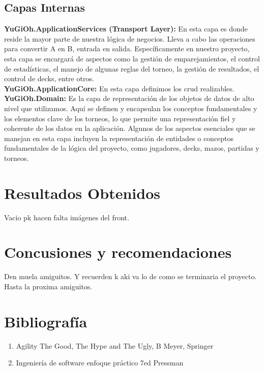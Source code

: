 \documentclass[a4paper]{article}
\begin{document}
\subsection{Capas Internas}
\textbf{YuGiOh.ApplicationServices (Transport Layer):} En esta capa es donde reside la mayor parte de nuestra lógica
de negocios. Lleva a cabo las operaciones para convertir A en B, entrada en salida.
Específicamente en nuestro proyecto, esta capa se encargará de aspectos como la
gestión de emparejamientos, el control de estadísticas, el manejo de algunas reglas
del torneo, la gestión de resultados, el control de decks, entre otros.\\
\textbf{YuGiOh.ApplicationCore:} En esta capa definimos los crud realizables.\\
\textbf{YuGiOh.Domain:} Es la capa de representación de los objetos de datos de alto nivel
que utilizamos. Aquí se definen y encapsulan los conceptos fundamentales y los
elementos clave de los torneos, lo que permite una representación fiel y coherente de los
datos en la aplicación. Algunos de los aspectos esenciales que se manejan en esta
capa incluyen la representación de entidades o conceptos fundamentales de la
lógica del proyecto, como jugadores, decks, mazos, partidas y torneos.
\newpage

\section{Resultados Obtenidos}
Vacio pk hacen falta im\'agenes del front.

\newpage

\section{Concusiones y recomendaciones}
Den muela amiguitos. Y recuerden k aki va lo de como se terminaria el proyecto. Hasta la proxima amiguitos.

\newpage

\section{Bibliograf\'ia}

\begin{enumerate}
\item Agility The Good, The Hype and The Ugly, B Meyer, Springer
\item Ingenier\'ia de software enfoque pr\'actico 7ed Pressman
\end{enumerate}
\end{document}
